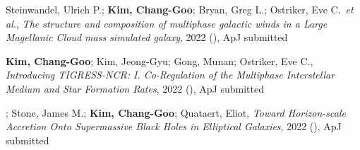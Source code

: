 \item Steinwandel, Ulrich P.; \textbf{Kim, Chang-Goo}; Bryan, Greg L.; Ostriker, Eve C.~\textit{et al.}, \textit{The structure and composition of multiphase galactic winds in a Large Magellanic Cloud mass simulated galaxy}, 2022 (), ApJ submitted

\item \textbf{Kim, Chang-Goo}; Kim, Jeong-Gyu; Gong, Munan; Ostriker, Eve C., \textit{Introducing TIGRESS-NCR: I. Co-Regulation of the Multiphase Interstellar Medium and Star Formation Rates}, 2022 (), ApJ submitted

\item {}; Stone, James M.; \textbf{Kim, Chang-Goo}; Quataert, Eliot, \textit{Toward Horizon-scale Accretion Onto Supermassive Black Holes in Elliptical Galaxies}, 2022 (), ApJ submitted